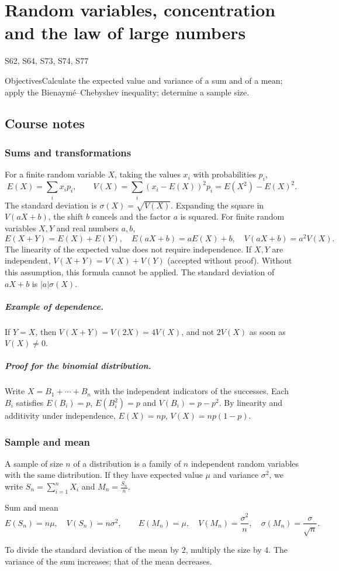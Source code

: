 \setcounter{chapter}{13}\chapter{Random variables, concentration and the law of large numbers}\label{ch:14}

{\small\sffamily\color{teal}S62, S64, S73, S74, S77\par}

\begin{retenir}{Objectives}Calculate the expected value and variance of a sum and of a mean; apply the Bienaymé--Chebyshev inequality; determine a sample size.\end{retenir}

\section{Course notes}
\subsection{Sums and transformations}
For a finite random variable $X$, taking the values $x_i$ with probabilities $p_i$,
\[E(X)=\sum_i x_ip_i,\qquad V(X)=\sum_i(x_i-E(X))^2p_i=E(X^2)-E(X)^2.\]
The standard deviation is $\sigma(X)=\sqrt{V(X)}$. Expanding the square in $V(aX+b)$, the shift $b$ cancels and the factor $a$ is squared.
For finite random variables $X,Y$ and real numbers $a,b$,
\[E(X+Y)=E(X)+E(Y),\quad E(aX+b)=aE(X)+b,\quad V(aX+b)=a^2V(X).\]
The linearity of the expected value does not require independence. If $X,Y$ are independent, $V(X+Y)=V(X)+V(Y)$ (accepted without proof). Without this assumption, this formula cannot be applied. The standard deviation of $aX+b$ is $|a|\sigma(X)$.
\paragraph{Example of dependence.} If $Y=X$, then $V(X+Y)=V(2X)=4V(X)$, and not $2V(X)$ as soon as $V(X)\ne0$.
\paragraph{Proof for the binomial distribution.} Write $X=B_1+\cdots+B_n$ with the independent indicators of the successes. Each $B_i$ satisfies $E(B_i)=p$, $E(B_i^2)=p$ and $V(B_i)=p-p^2$. By linearity and additivity under independence, $E(X)=np$, $V(X)=np(1-p)$.
\subsection{Sample and mean}
A sample of size $n$ of a distribution is a family of $n$ independent random variables with the same distribution. If they have expected value $\mu$ and variance $\sigma^2$, we write $S_n=\sum_{i=1}^nX_i$ and $M_n=\frac{S_n}{n}$.
\begin{retenir}{Sum and mean}
\[E(S_n)=n\mu,\quad V(S_n)=n\sigma^2,\qquad E(M_n)=\mu,\quad V(M_n)=\frac{\sigma^2}{n},\quad\sigma(M_n)=\frac\sigma{\sqrt n}.\]
\end{retenir}
To divide the standard deviation of the mean by $2$, multiply the size by $4$. The variance of the sum increases; that of the mean decreases.

